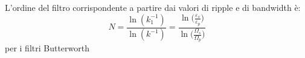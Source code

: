 \documentclass[12pt]{report}
\begin{document}
L'ordine del filtro corrispondente a partire dai valori di ripple e di bandwidth è:
\begin{equation}
    N=\frac{\ln{(k_1^{-1})}}{\ln{(k^{-1})}} = \frac{\ln{\bigl(\frac{\varepsilon_s}{\varepsilon_p}}\bigr)}{\ln{\bigl(\frac{\Omega_s}{\Omega_p}}\bigr)}
\end{equation}
per i filtri Butterworth
%
%
 

%
%

\printbibliography

\closingpage
\end{document}

